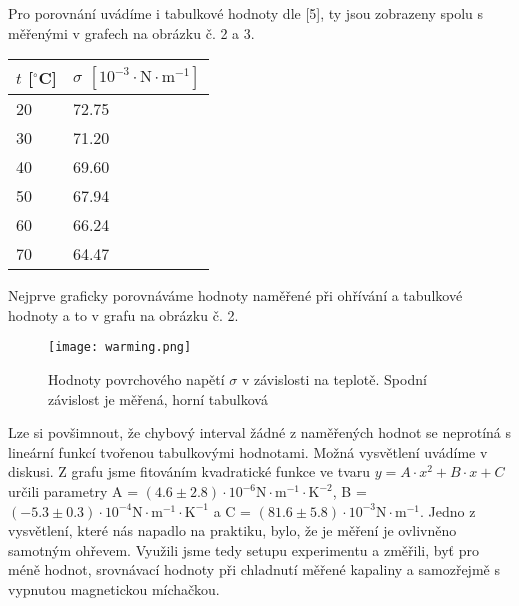 \documentclass[a4paper]{article}
\begin{document}
\par Pro porovnání uvádíme i tabulkové hodnoty dle [5], ty jsou zobrazeny spolu s měřenými v grafech na obrázku č. 2 a 3.
\begin{center}
    \label{tab:title}
    \begin{tabular}{ | l |  p{3cm} |} \hline
    $t$ [$^\circ$C] & $\sigma$ $\mathrm{[ 10^{-3} \cdot N \cdot m^{-1}]}$  \\ \hline
    20 & 72.75 \\ \hline
    30 & 71.20 \\ \hline
    40 & 69.60 \\ \hline
    50 & 67.94  \\ \hline
    60 & 66.24 \\ \hline
    70 & 64.47 \\ \hline
    \end{tabular}
\end{center}
\par Nejprve graficky porovnáváme hodnoty naměřené při ohřívání a tabulkové hodnoty a to v grafu na obrázku č. 2. 
\begin{figure}[H]
\centering
\texttt{[image: warming.png]}
\caption{Hodnoty povrchového napětí $\sigma$ v závislosti na teplotě. Spodní závislost je měřená, horní tabulková}
\end{figure}
\par Lze si povšimnout, že chybový interval žádné z naměřených hodnot se neprotíná s lineární funkcí tvořenou tabulkovými hodnotami. Možná vysvětlení uvádíme v diskusi.
Z grafu jsme fitováním kvadratické funkce ve tvaru $y = A \cdot x^{2} + B \cdot x + C$ určili parametry A = $(4.6\pm2.8) \cdot 10^{-6} \mathrm{N \cdot m^{-1} \cdot K^{-2}}$, B = $(-5.3\pm0.3) \cdot 10^{-4} \mathrm{N \cdot m^{-1} \cdot K^{-1}}$ a C = $(81.6\pm5.8) \cdot 10^{-3} \mathrm{N \cdot m^{-1}}$. Jedno z vysvětlení, které nás napadlo na praktiku, bylo, že je měření je ovlivněno samotným ohřevem. Využili jsme tedy setupu experimentu a změřili, byť pro méně hodnot, srovnávací hodnoty při chladnutí měřené kapaliny a samozřejmě s vypnutou magnetickou míchačkou.
\newpage
\end{document}
